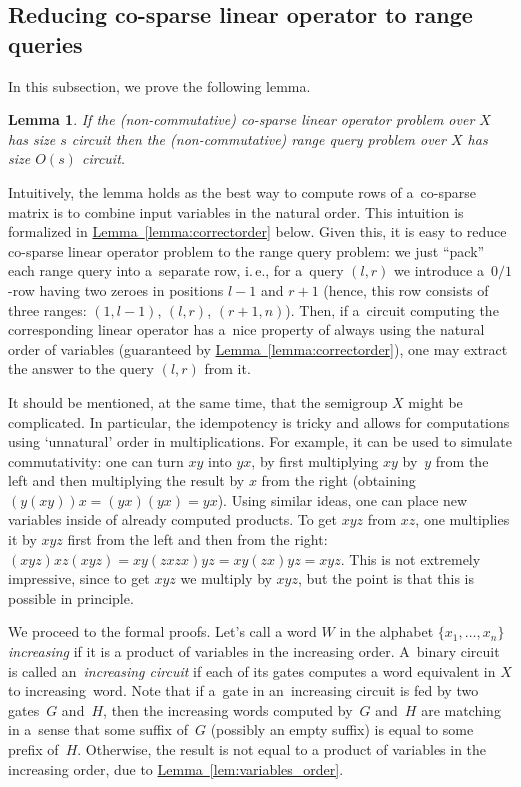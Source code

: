 \documentclass[11pt]{article}
\numberwithin{equation}{section}
\newtheorem{lemma}[theorem]{Lemma}
\theoremstyle{definition}
\theoremstyle{plain}
\newcommand{\ie}{i.\,e.}
\newcommand{\expref}[2]{\hyperref[#2]{#1~\ref{#2}}}
\theoremstyle{plain}\newtheorem{observation}[theorem]{Observation}
\begin{document}
\subsection{Reducing
    co-sparse
    linear operator to range queries} \label{sec:operators_to_queries}
In this subsection, we prove the following lemma.

\begin{lemma} \label{lem:dense_matrices}
    If the (non-commutative)
    co-sparse
    linear operator problem over $X$ has size $s$
    circuit then the (non-commutative)
    range query
    problem over $X$ has size
    $O(s)$ circuit.
\end{lemma}

Intuitively, the lemma holds as the best way to compute rows of
%
%
a~co-sparse
matrix is to combine input variables in the natural order. This intuition is formalized in \expref{Lemma}{lemma:correctorder} below. Given this, it is easy to reduce
%
%
co-sparse
linear operator problem to the
%
%
range query
problem: we just ``pack'' each range query into a~separate row, \ie, for a~query $(l,r)$ we introduce a~$0/1$-row having two zeroes in positions $l-1$ and $r+1$ (hence, this row consists of three ranges: $(1,l-1)$, $(l,r)$, $(r+1,n)$). Then, if a~circuit computing the corresponding linear operator has a~nice property of always using the natural order of variables (guaranteed by \expref{Lemma}{lemma:correctorder}), one may extract the answer to the query $(l,r)$ from it.


It should be mentioned, at the same time, that the semigroup $X$ might be complicated.
In particular, the idempotency is tricky and allows for computations using `unnatural' order in multiplications. For example, it can be used to simulate commutativity: one can turn $xy$ into $yx$, by first multiplying $xy$ by~$y$ from the left and then multiplying the result by $x$ from the right (obtaining $(y(xy))x=(yx)(yx)=yx$). Using similar ideas, one can place new variables inside of already computed products. To get $xyz$ from $xz$, one multiplies it by $xyz$ first from the left and then from the right: $(xyz)xz(xyz)=xy(zxzx)yz=xy(zx)yz=xyz$.
This is not extremely impressive, since to get $xyz$ we multiply by $xyz$, but the point is that this is possible in principle.

We proceed to the formal proofs. Let's call a word $W$ in the alphabet $\{x_1,\ldots,x_n\}$ \emph{increasing} if it is a product of variables in the increasing order. A~binary circuit is called an~\emph{increasing circuit} if each of its gates computes a word equivalent in $X$ to increasing~word.
Note that if a~gate in an~increasing circuit is fed by two gates~$G$ and~$H$, then the increasing words computed by~$G$ and~$H$ are matching in a~sense that some suffix of~$G$ (possibly an empty suffix) is equal to some prefix of~$H$. Otherwise, the result is not equal to a product of variables in the increasing order, due to \expref{Lemma}{lem:variables_order}.
\end{document}
